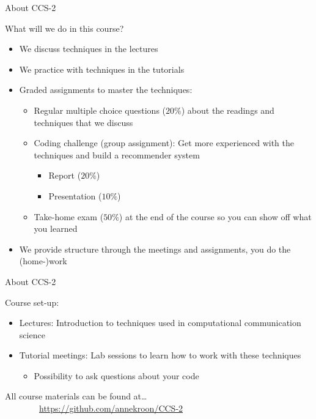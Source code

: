 \documentclass[handout]{beamer}
\begin{document}
\begin{frame}{About CCS-2} 

What will we do in this course?	
	\begin{itemize}
		\item We discuss techniques in the lectures
		\item We practice with techniques in the tutorials
		\item Graded assignments to master the techniques:
		\begin{itemize}
			\item Regular multiple choice questions (\(20\%\)) about the readings and techniques that we discuss
			\item Coding challenge (group assignment): Get more experienced with the techniques and build a recommender system
			\begin{itemize}
				\item Report (\(20\%\))
				\item Presentation (\(10\%\))
			\end{itemize}
			\item Take-home exam (\(50\%\)) at the end of the course so you can show off what you learned
		\end{itemize}
		\item We provide structure through the meetings and assignments, you do the (home-)work
	\end{itemize}
	
\end{frame}


\begin{frame}{About CCS-2} 
	
Course set-up:
\begin{itemize}
	\item Lectures: Introduction to techniques used in computational communication science
	\item Tutorial meetings: Lab sessions to learn how to work with these techniques
	\begin{itemize}
		\item Possibility to ask questions about your code
	\end{itemize}
\end{itemize}

\end{frame}

\begin{frame} 
	All course materials can be found at\ldots \\
	~~~~~~~~\url{https://github.com/annekroon/CCS-2}
\end{frame}
\end{document}
